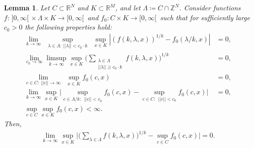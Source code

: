 \documentclass[reqno]{amsart}
\theoremstyle{plain}
\newtheorem{lemma}[theorem]{Lemma}
\theoremstyle{definition}
\numberwithin{equation}{section}
\newcommand{\R}{\mathbb{R}}
\newcommand{\Z}{\mathbb{Z}}
\newcommand{\ra}{\rightarrow}
\begin{document}
\begin{lemma}\label{Limeslemma_Reihe}
Let $C \subset \R^N$ and $K \subset \R^M$, and let $\Lambda \coloneqq C \cap \Z^N$.
Consider functions $f:\,]0,\infty[\, \times \Lambda \times K \ra [0,\infty[\,$ and $f_0:C \times K \ra [0,\infty[\,$
            such that for sufficiently large $c_0>0$ the following properties hold:
\begin{align}
 \lim\limits_{k \to \infty} \>\>\sup\limits_{\lambda \in \Lambda: \>||\lambda|| < c_0 \cdot k}\>\> \sup\limits_{x \in K}
|(f(k,\lambda,x))^{1/k}-f_0(\lambda/k,x)|&=0, \label{Limeslemma_Reihe_Voraussetzung_Konvergenz_Summanden} \\
\lim\limits_{c_0 \to \infty} \limsup_{k \to \infty} \sup\limits_{x \in K} \Bigg( \sum\limits_{\substack{\lambda\in\Lambda \\ ||\lambda|| \geq c_0 \cdot k}}
f(k,\lambda,x) \Bigg)^{1/k} &= 0, \label{Limeslemma_Reihe_Voraussetzung_Kontrolle_Restreihe} \\
\lim\limits_{c \in C : \> ||c|| \to \infty} \>\> \sup\limits_{x \in K} f_0(c,x) &=0, \label{Limeslemma_Reihe_Voraussetzung_Kontrolle_Limes} \\
  \lim\limits_{k \to \infty}
\sup\limits_{x \in K} \Bigg|
\sup\limits_{c \in \Lambda/k :\>\> ||c|| < c_0} f_0(c,x)
-
\sup\limits_{c \in C :\>\> ||c|| < c_0} f_0(c,x)
\Bigg|
&=
0, \label{Limeslemma_Reihe_Voraussetzung_Uebergang_Lambda_durch_k_C} \\
\sup\limits_{c \in C} \sup\limits_{x \in K} f_0(c,x) < \infty. \label{Limeslemma_Reihe_Voraussetzung_Beschraenktheit_f_0}
\end{align}
Then,
\begin{align*}
\lim\limits_{k \to \infty} \sup\limits_{x \in K} \Bigg| 
\Bigg( \sum\limits_{\lambda\in\Lambda} f(k,\lambda,x) \Bigg)^{1/k} - \sup\limits_{c \in C} f_0(c,x) \Bigg| = 0.
\end{align*}


\end{lemma}
\end{document}
